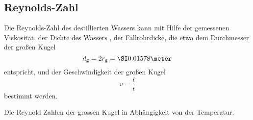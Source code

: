 \subsection{Reynolds-Zahl}

Die Reynolds-Zahl des destillierten Wassers kann mit Hilfe der gemessenen Viskosität, der Dichte des Wassers \cite{TfCuP},
der Fallrohrdicke, die etwa dem Durchmesser der großen Kugel
\begin{equation*}
  d_\text{g} = 2 r_\text{g} = \grosseKugelDurchmesser
\end{equation*}
entspricht, und der Geschwindigkeit der großen Kugel
\begin{equation*}
  v = \frac{l}{t}
\end{equation*}
bestimmt werden.

\begin{table}
  \centering
  
  \caption{Die Reynold Zahlen der grossen Kugel in Abhängigkeit von der Temperatur.}
  \label{tab:grosse_kugel_reynold}
\end{table}